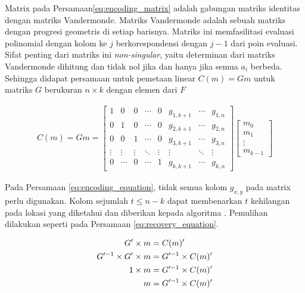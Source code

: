 Matrix pada Persamaan\ref{eq:encoding_matrix} adalah gabungan matriks identitas dengan matriks Vandermonde. Matriks Vandermonde adalah sebuah matriks dengan progresi geometris di setiap barisnya. Matriks ini memfasilitasi evaluasi polinomial dengan kolom ke $j$ berkorespondensi dengan $j - 1$ dari poin evaluasi. Sifat penting dari matriks ini \textit{non-singular}, yaitu determinan dari matriks Vandermonde dihitung dan tidak nol jika dan hanya jika semua $a_i$ berbeda. Sehingga didapat persamaan untuk pemetaan linear $C(m) = Gm$ untuk matriks $G$ berukuran ${n} \times {k}$ dengan elemen dari $F$

\begin{align}
	C(m) = Gm =
	\begin{bmatrix}
		1      & 0      & 0      & \cdots & 0      & g_{1,k+1} & \cdots & g_{1,n} \\
		0      & 1      & 0      & \cdots & 0      & g_{2,k+1} & \cdots & g_{2,n} \\
		0      & 0      & 1      & \cdots & 0      & g_{3,k+1} & \cdots & g_{3,n} \\
		\vdots & \vdots & \vdots & \ddots & \vdots & \vdots    & \ddots & \vdots  \\
		0      & \cdots & 0      & \cdots & 1      & g_{k,k+1} & \cdots & g_{k,n}
	\end{bmatrix}
	\begin{bmatrix}
		m_0    \\
		m_1    \\
		\vdots \\
		m_{k-1}
	\end{bmatrix}
	\label{eq:encoding_equation}
\end{align}

Pada Persamaan \ref{eq:encoding_equation}, tidak semua kolom $g_{x,y}$ pada matrix perlu digunakan. Kolom sejumlah $t \le n - k$ dapat membenarkan $t$ kehilangan pada lokasi yang diketahui dan diberikan kepada algoritma \parencite{riley2001introduction}. Pemulihan dilakukan seperti pada Persamaan \ref{eq:recovery_equation}.

\begin{align}
	G' \times m                & = C(m)' \notag                \\
	G'^{-1} \times G' \times m & = G'^{-1} \times C(m)' \notag \\
	1 \times m                 & = G'^{-1} \times C(m)' \notag \\
	m                          & = G'^{-1} \times C(m)'
	\label{eq:recovery_equation}
\end{align}

